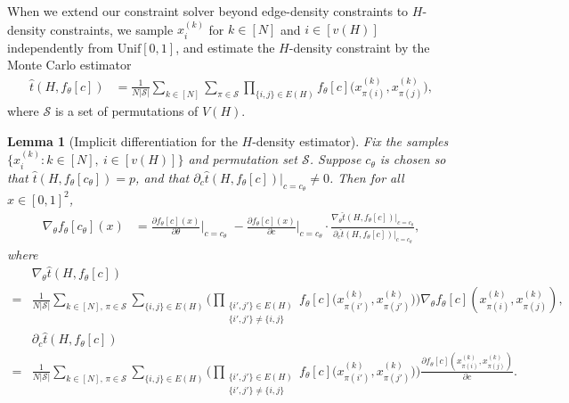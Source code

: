 \documentclass{article}
\theoremstyle{plain}
\newtheorem{lemma}{Lemma}[section]
\theoremstyle{definition}
\theoremstyle{remark}
\begin{document}
When we extend our constraint solver beyond edge-density constraints to $H$-density constraints, we sample
$x_{i}^{(k)}$ for $k \in [N]$ and $i \in [v(H)]$ independently from $\mathrm{Unif}[0,1]$, and estimate the $H$-density constraint by the Monte Carlo estimator
\begin{align*}
\widehat{t}(H, f_\theta[c])
&= \frac{1}{N|\mathcal{S}|}
\sum_{k \in [N]}\sum_{\pi \in \mathcal{S}}
\prod_{\{i, j\} \in E(H)} f_\theta[c]\Big(x_{\pi(i)}^{(k)}, x_{\pi(j)}^{(k)}\Big),
\end{align*}
where $\mathcal{S}$ is a set of permutations of $V(H)$. 

\begin{lemma}[Implicit differentiation for the $H$-density estimator]
\label{lem:implicitdifferentiation:Hdensity}
Fix the samples \(\{x_i^{(k)} : k\in[N],\ i\in[v(H)]\}\) and permutation set \(\mathcal{S}\). Suppose \(c_\theta\) is chosen so that
\(\widehat{t}(H,f_\theta[c_\theta]) = p\), and that \(\partial_c\widehat{t}(H,f_\theta[c])\big|_{c=c_\theta} \neq 0\).
Then for all \(x \in [0,1]^2\),
\begin{align*}
\nabla_\theta f_\theta[c_\theta](x)
&= \frac{\partial f_\theta[c](x)}{\partial \theta}\Big|_{c=c_\theta}
\;-
\frac{\partial f_\theta[c](x)}{\partial c}\Big|_{c=c_\theta}
\cdot
\frac{\nabla_\theta\widehat{t}(H,f_\theta[c])\big|_{c=c_\theta}}{\partial_c\widehat{t}(H,f_\theta[c])\big|_{c=c_\theta}},
\end{align*}
where
\begin{align*}
&\nabla_\theta\widehat{t}(H,f_\theta[c])
\\
{} = &\frac{1}{N|\mathcal{S}|}
\sum_{k\in[N],\,\pi\in\mathcal{S}}
\sum_{\{i,j\}\in E(H)}
\Bigg(\prod_{\substack{\{i',j'\}\in E(H)\\ \{i',j'\}\neq\{i,j\}}}
f_\theta[c]\bigl(x_{\pi(i')}^{(k)},x_{\pi(j')}^{(k)}\bigr)\Bigg)
\nabla_\theta f_\theta[c](x_{\pi(i)}^{(k)},x_{\pi(j)}^{(k)}),
\\
&\partial_c\widehat{t}(H,f_\theta[c])
\\
{} = &\frac{1}{N|\mathcal{S}|}
\sum_{k\in[N],\,\pi\in\mathcal{S}}
\sum_{\{i,j\}\in E(H)}
\Bigg(\prod_{\substack{\{i',j'\}\in E(H)\\ \{i',j'\}\neq\{i,j\}}}
f_\theta[c]\bigl(x_{\pi(i')}^{(k)},x_{\pi(j')}^{(k)}\bigr)\Bigg)
\frac{\partial f_\theta[c](x_{\pi(i)}^{(k)},x_{\pi(j)}^{(k)})}{\partial c}.
\end{align*}
\end{lemma}
\end{document}
